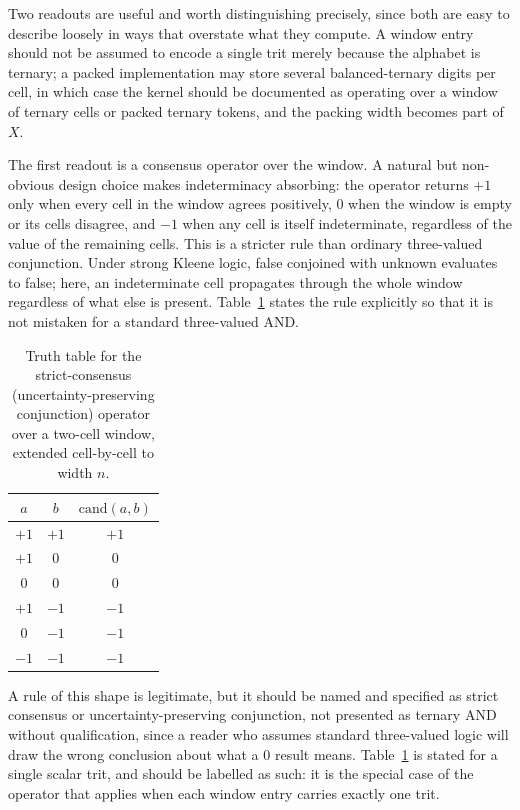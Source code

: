 \documentclass[11pt]{article}
\begin{document}
Two readouts are useful and worth distinguishing precisely, since both are easy to describe loosely in ways that overstate what they compute. A window entry should not be assumed to encode a single trit merely because the alphabet is ternary; a packed implementation may store several balanced-ternary digits per cell, in which case the kernel should be documented as operating over a window of ternary cells or packed ternary tokens, and the packing width becomes part of $X$.

The first readout is a consensus operator over the window. A natural but non-obvious design choice makes indeterminacy absorbing: the operator returns $+1$ only when every cell in the window agrees positively, $0$ when the window is empty or its cells disagree, and $-1$ when any cell is itself indeterminate, regardless of the value of the remaining cells. This is a stricter rule than ordinary three-valued conjunction. Under strong Kleene logic, false conjoined with unknown evaluates to false; here, an indeterminate cell propagates through the whole window regardless of what else is present. Table~\ref{tab:cand} states the rule explicitly so that it is not mistaken for a standard three-valued AND.

\begin{table}[h]
\centering
\caption{Truth table for the strict-consensus (uncertainty-preserving conjunction) operator over a two-cell window, extended cell-by-cell to width $n$.}
\label{tab:cand}
\begin{tabular}{cc|c}
\toprule
$a$ & $b$ & $\mathrm{cand}(a,b)$ \\
\midrule
$+1$ & $+1$ & $+1$ \\
$+1$ & $0$ & $0$ \\
$0$ & $0$ & $0$ \\
$+1$ & $-1$ & $-1$ \\
$0$ & $-1$ & $-1$ \\
$-1$ & $-1$ & $-1$ \\
\bottomrule
\end{tabular}
\end{table}

A rule of this shape is legitimate, but it should be named and specified as strict consensus or uncertainty-preserving conjunction, not presented as ternary AND without qualification, since a reader who assumes standard three-valued logic will draw the wrong conclusion about what a $0$ result means. Table~\ref{tab:cand} is stated for a single scalar trit, and should be labelled as such: it is the special case of the operator that applies when each window entry carries exactly one trit.
\end{document}
